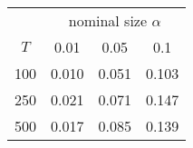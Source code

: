 % 
\begin{tabular}{cccc}
  \hline
  & \multicolumn{3}{c}{nominal size $\alpha$} \\
 $T$ & 0.01 & 0.05 & 0.1 \\
 \hline
100 & 0.010 & 0.051 & 0.103 \\ 
  250 & 0.021 & 0.071 & 0.147 \\ 
  500 & 0.017 & 0.085 & 0.139 \\ 
   \hline
\end{tabular}
